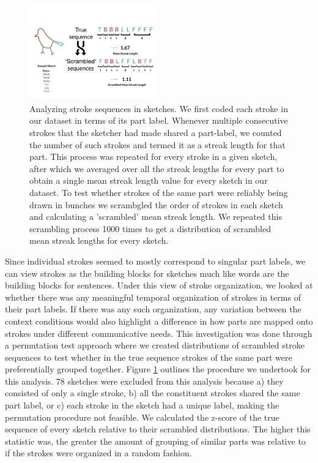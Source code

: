 \documentclass[10pt,letterpaper]{article}
\newcommand{\kushin}[1]{{\color{orange}{[kushin: #1]}}}
\begin{document}
\begin{figure}[htbp]
\centering
\includegraphics[width=0.48\textwidth]{figures/part_sequence.pdf}
\caption{\kushin{todo: update caption}Analyzing stroke sequences in sketches. We first coded each stroke in our dataset in terms of its part label. Whenever multiple consecutive strokes that the sketcher had made shared a part-label, we counted the number of such strokes and termed it as a streak length for that part. This process was repeated for every stroke in a given sketch, after which we averaged over all the streak lengths for every part to obtain a single mean streak length value for every sketch in our dataset. To test whether strokes of the same part were reliably being drawn in bunches we scrambgled the order of strokes in each sketch and calculating a 'scrambled' mean streak length. We repeated this scrambling process 1000 times to get a distribution of scrambled mean streak lengths for every sketch.}
\label{stroke_sequence_fig}
\end{figure}


Since individual strokes seemed to mostly correspond to singular part labels, we can view strokes as the building blocks for sketches much like words are the building blocks for sentences. Under this view of stroke organization, we looked at whether there was any meaningful temporal organization of strokes in terms of their part labels. If there was any such organization, any variation between the context conditions would also highlight a difference in how parts are mapped onto strokes under different communicative needs. This investigation was done through a permutation test approach where we created distributions of scrambled stroke sequences to test whether in the true sequence strokes of the same part were preferentially grouped together. Figure \ref{stroke_sequence_fig} outlines the procedure we undertook for this analysis.
78 sketches were excluded from this analysis because a) they consisted of only a single stroke, b) all the constituent strokes shared the same part label, or c) each stroke in the sketch had a unique label, making the permutation procedure not feasible.
We calculated the z-score of the true sequence of every sketch relative to their scrambled distributions. The higher this statistic was, the greater the amount of grouping of similar parts was relative to if the strokes were organized in a random fashion.
\end{document}

